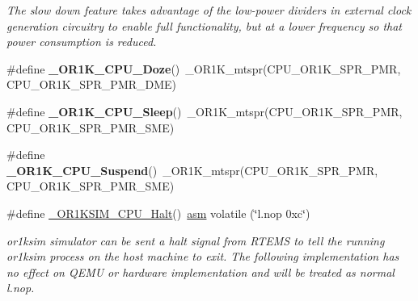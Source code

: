 \begin{DoxyCompactItemize}
\begin{DoxyCompactList}\small\item\em The slow down feature takes advantage of the low-\/power dividers in external clock generation circuitry to enable full functionality, but at a lower frequency so that power consumption is reduced. \end{DoxyCompactList}\item 
\mbox{\label{or1k-utility_8h_acf2c562c084c77ed1f8affc5188accb1}} 
\#define {\bfseries \+\_\+\+O\+R1\+K\+\_\+\+C\+P\+U\+\_\+\+Doze}()~\+\_\+\+O\+R1\+K\+\_\+mtspr(C\+P\+U\+\_\+\+O\+R1\+K\+\_\+\+S\+P\+R\+\_\+\+P\+MR, C\+P\+U\+\_\+\+O\+R1\+K\+\_\+\+S\+P\+R\+\_\+\+P\+M\+R\+\_\+\+D\+ME)
\item 
\mbox{\label{or1k-utility_8h_aeb76ce011de399e25d05d0ab9f00814f}} 
\#define {\bfseries \+\_\+\+O\+R1\+K\+\_\+\+C\+P\+U\+\_\+\+Sleep}()~\+\_\+\+O\+R1\+K\+\_\+mtspr(C\+P\+U\+\_\+\+O\+R1\+K\+\_\+\+S\+P\+R\+\_\+\+P\+MR, C\+P\+U\+\_\+\+O\+R1\+K\+\_\+\+S\+P\+R\+\_\+\+P\+M\+R\+\_\+\+S\+ME)
\item 
\mbox{\label{or1k-utility_8h_ac3a3da79c008d8153aae62d07ad2c9a3}} 
\#define {\bfseries \+\_\+\+O\+R1\+K\+\_\+\+C\+P\+U\+\_\+\+Suspend}()~\+\_\+\+O\+R1\+K\+\_\+mtspr(C\+P\+U\+\_\+\+O\+R1\+K\+\_\+\+S\+P\+R\+\_\+\+P\+MR, C\+P\+U\+\_\+\+O\+R1\+K\+\_\+\+S\+P\+R\+\_\+\+P\+M\+R\+\_\+\+S\+ME)
\item 
\#define \mbox{\hyperlink{or1k-utility_8h_a48b0b2071b54ae5c6d900674c7ab4016}{\+\_\+\+O\+R1\+K\+S\+I\+M\+\_\+\+C\+P\+U\+\_\+\+Halt}}()~\mbox{\hyperlink{group__RTEMSScoreCPUExample_ga04cbac6d343a5c80b8e4547131c6bfcd}{asm}} volatile (\char`\"{}l.\+nop 0xc\char`\"{})
\begin{DoxyCompactList}\small\item\em or1ksim simulator can be sent a halt signal from R\+T\+E\+MS to tell the running or1ksim process on the host machine to exit. The following implementation has no effect on Q\+E\+MU or hardware implementation and will be treated as normal l.\+nop. \end{DoxyCompactList}\end{DoxyCompactItemize}
